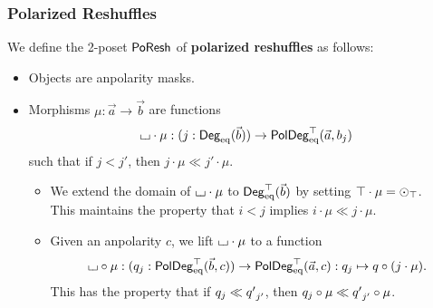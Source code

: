 \documentclass[a4paper]{memoir}
\begin{document}
\subsubsection{Polarized Reshuffles}
\begin{definition}\label{def:poreshcat}
	We define the 2-poset $\poreshcat$ of \textbf{polarized reshuffles} as follows:
	\begin{itemize}
		\item Objects are anpolarity masks.
		\item Morphisms $\mu : \vec a \to \vec b$ are functions
		\[
			\loch \cdot \mu : (j : \Degeq(\vec b)) \to \poldegeqtop(\vec a, b_j)
		\]
		such that if $j < j'$, then $j \cdot \mu \ll j' \cdot \mu$.
		\begin{itemize}
			\item We extend the domain of $\loch \cdot \mu$ to $\Degeqtop(\vec b)$ by setting $\top \cdot \mu = \dpol \top \nonpol$. \\
			This maintains the property that $i < j$ implies $i \cdot \mu \ll j \cdot \mu$.
			\item Given an anpolarity $c$, we lift $\loch \cdot \mu$ to a function
			\begin{equation} \label{eq:poldeg-poresh}
				\loch \circ \mu : (\dpol j q : \poldegeqtop(\vec b, c)) \to \poldegeqtop(\vec a, c) : \dpol j q \mapsto q \circ (j \cdot \mu).
			\end{equation}
			This has the property that if $\dpol j q \ll \dpol{{j'}}{q'}$, then $\dpol j q \circ \mu \ll \dpol{{j'}}{q'} \circ \mu$.

\end{itemize}
\end{itemize}
\end{definition}
\end{document}
